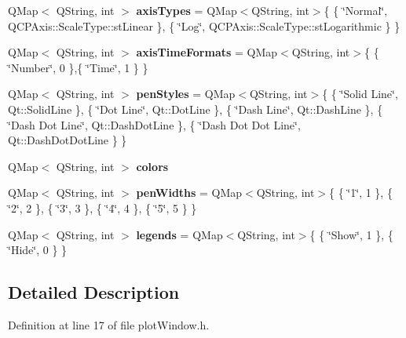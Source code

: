 \begin{DoxyCompactItemize}
\item 
\mbox{\label{structplotformat_a1139da0f53a284a8c89a72e45b6e2139}} 
Q\+Map$<$ Q\+String, int $>$ {\bfseries axis\+Types} = Q\+Map$<$Q\+String, int$>$\{ \{ \char`\"{}Normal\char`\"{}, Q\+C\+P\+Axis\+::\+Scale\+Type\+::st\+Linear \}, \{ \char`\"{}Log\char`\"{}, Q\+C\+P\+Axis\+::\+Scale\+Type\+::st\+Logarithmic \} \}
\item 
\mbox{\label{structplotformat_a96d9fe026638122b2f62456c690bea45}} 
Q\+Map$<$ Q\+String, int $>$ {\bfseries axis\+Time\+Formats} = Q\+Map$<$Q\+String, int$>$\{ \{ \char`\"{}Number\char`\"{}, 0 \},\{ \char`\"{}Time\char`\"{}, 1 \} \}
\item 
\mbox{\label{structplotformat_a4f438c3f066649a53adae3b47e027384}} 
Q\+Map$<$ Q\+String, int $>$ {\bfseries pen\+Styles} = Q\+Map$<$Q\+String, int$>$\{ \{ \char`\"{}Solid Line\char`\"{}, Qt\+::\+Solid\+Line \}, \{ \char`\"{}Dot Line\char`\"{}, Qt\+::\+Dot\+Line \}, \{ \char`\"{}Dash Line\char`\"{}, Qt\+::\+Dash\+Line \}, \{ \char`\"{}Dash Dot Line\char`\"{}, Qt\+::\+Dash\+Dot\+Line \}, \{ \char`\"{}Dash Dot Dot Line\char`\"{}, Qt\+::\+Dash\+Dot\+Dot\+Line \} \}
\item 
Q\+Map$<$ Q\+String, int $>$ {\bfseries colors}
\item 
\mbox{\label{structplotformat_a99999f4a63f94fae7818eeef38108cbc}} 
Q\+Map$<$ Q\+String, int $>$ {\bfseries pen\+Widths} = Q\+Map$<$Q\+String, int$>$\{ \{ \char`\"{}1\char`\"{}, 1 \}, \{ \char`\"{}2\char`\"{}, 2 \}, \{ \char`\"{}3\char`\"{}, 3 \}, \{ \char`\"{}4\char`\"{}, 4 \}, \{ \char`\"{}5\char`\"{}, 5 \} \}
\item 
\mbox{\label{structplotformat_a16edd04cda977616b8fe868076446f09}} 
Q\+Map$<$ Q\+String, int $>$ {\bfseries legends} = Q\+Map$<$Q\+String, int$>$\{ \{ \char`\"{}Show\char`\"{}, 1 \}, \{ \char`\"{}Hide\char`\"{}, 0 \} \}
\end{DoxyCompactItemize}


\subsection{Detailed Description}


Definition at line 17 of file plot\+Window.\+h.



